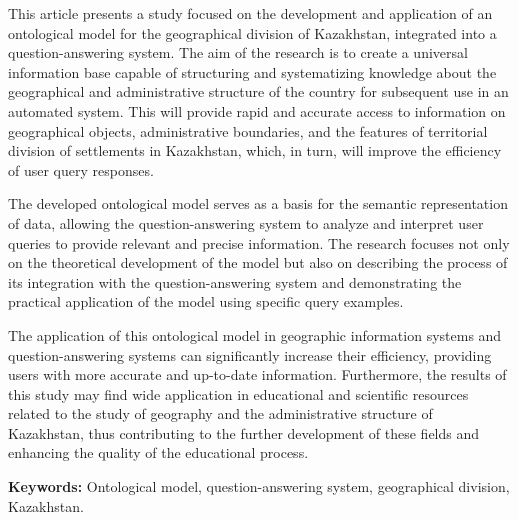 This article presents a study focused on the development and application
of an ontological model for the geographical division of Kazakhstan,
integrated into a question-answering system. The aim of the research is
to create a universal information base capable of structuring and
systematizing knowledge about the geographical and administrative
structure of the country for subsequent use in an automated system. This
will provide rapid and accurate access to information on geographical
objects, administrative boundaries, and the features of territorial
division of settlements in Kazakhstan, which, in turn, will improve the
efficiency of user query responses.

The developed ontological model serves as a basis for the semantic
representation of data, allowing the question-answering system to
analyze and interpret user queries to provide relevant and precise
information. The research focuses not only on the theoretical
development of the model but also on describing the process of its
integration with the question-answering system and demonstrating the
practical application of the model using specific query examples.

The application of this ontological model in geographic information
systems and question-answering systems can significantly increase their
efficiency, providing users with more accurate and up-to-date
information. Furthermore, the results of this study may find wide
application in educational and scientific resources related to the study
of geography and the administrative structure of Kazakhstan, thus
contributing to the further development of these fields and enhancing
the quality of the educational process.

{\bfseries Keywords:} Ontological model, question-answering system,
geographical division, Kazakhstan.

